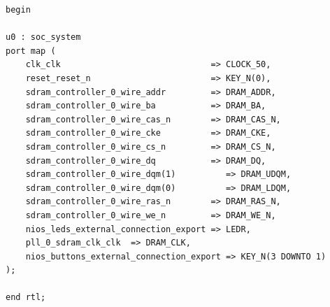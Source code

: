 \begin{appendices}
\begin{verbatim}
begin

u0 : soc_system
port map (
    clk_clk                              => CLOCK_50,      
    reset_reset_n                        => KEY_N(0),   
    sdram_controller_0_wire_addr         => DRAM_ADDR,     
    sdram_controller_0_wire_ba           => DRAM_BA,       
    sdram_controller_0_wire_cas_n        => DRAM_CAS_N,
    sdram_controller_0_wire_cke          => DRAM_CKE, 
    sdram_controller_0_wire_cs_n         => DRAM_CS_N,     
    sdram_controller_0_wire_dq           => DRAM_DQ,       
    sdram_controller_0_wire_dqm(1)          => DRAM_UDQM, 
    sdram_controller_0_wire_dqm(0)          => DRAM_LDQM,   
    sdram_controller_0_wire_ras_n        => DRAM_RAS_N,    
    sdram_controller_0_wire_we_n         => DRAM_WE_N,   
    nios_leds_external_connection_export => LEDR, 
    pll_0_sdram_clk_clk	 => DRAM_CLK,
    nios_buttons_external_connection_export => KEY_N(3 DOWNTO 1)
);

end rtl;

\end{verbatim}

\end{appendices}